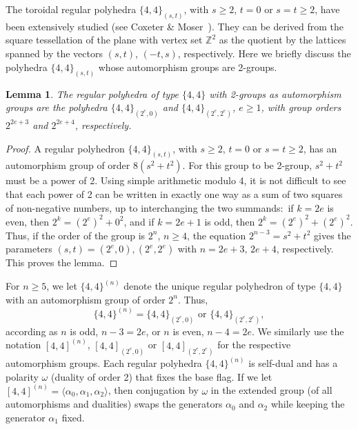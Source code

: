 \documentclass[12pt]{amsart}
\newtheorem{lemma}[theorem]{Lemma}
\theoremstyle{definition}
\begin{document}
The toroidal regular polyhedra $\{4,4\}_{(s,t)}$, with $s\geq 2$, $t=0$ or $s=t\geq 2$, have been extensively studied (see Coxeter \& Moser~\cite[Ch. 8]{CoxMos1980}). 
They can be derived from the square tessellation of the plane with vertex set $\mathbb{Z}^2$ as the quotient by the lattices spanned by the vectors $(s,t)$, $(-t,s)$, respectively. Here we briefly discuss the polyhedra $\{4,4\}_{(s,t)}$ whose automorphism groups are 2-groups.

\begin{lemma}
\label{lem44}
The regular polyhedra of type $\{4,4\}$ with 2-groups as automorphism groups are the polyhedra $\{4,4\}_{(2^e,0)}$ and $\{4,4\}_{(2^e,2^e)}$, $e\geq 1$, with group orders $2^{2e+3}$ and $2^{2e+4}$, respectively. 
\end{lemma}

\begin{proof}
A regular polyhedron $\{4,4\}_{(s,t)}$, with $s\geq 2$, $t=0$ or $s=t\geq 2$, has an automorphism group of order $8(s^2+t^2)$. For this group to be 2-group, $s^2+t^2$ must be a power of 2. Using simple arithmetic modulo 4, it is not difficult to see that each power of 2 can be written in exactly one way as a sum of two squares of non-negative numbers, up to interchanging the two summands:\ if $k=2e$ is even, then $2^k = (2^e)^2 +0^2$, and if $k=2e+1$ is odd, then $2^k = (2^e)^2 +(2^e)^2$. Thus, if the order of the group is $2^n$, $n\geq 4$, the equation $2^{n-3}=s^2+t^2$ gives the parameters $(s,t)=(2^e,0),(2^e,2^e)$ with $n=2e+3,\,2e+4$, respectively. This proves the lemma.
\end{proof}

For $n\geq 5$, we let $\{4,4\}^{(n)}$ denote the unique regular polyhedron of type $\{4,4\}$ with an automorphism group of order $2^n$. Thus, 
\begin{equation} 
\{4,4\}^{(n)}=\{4,4\}_{(2^e,0)}\mbox{ or }\{4,4\}_{(2^e,2^e)},
\end{equation} 
according as $n$ is odd, $n-3=2e$, or $n$ is even, $n-4=2e$. We similarly use the notation $[4,4]^{(n)}$, $[4,4]_{(2^e,0)}$ or $[4,4]_{(2^e,2^e)}$ for the respective automorphism groups. Each regular polyhedra $\{4,4\}^{(n)}$ is self-dual and has a polarity $\omega$ (duality of order 2) that fixes the base flag. If we let $[4,4]^{(n)} = \langle\alpha_0,\alpha_1,\alpha_2\rangle$, then conjugation by $\omega$ in the extended group (of all automorphisms and dualities) swaps the generators $\alpha_0$ and $\alpha_2$ while keeping the generator $\alpha_1$ fixed.
\end{document}
